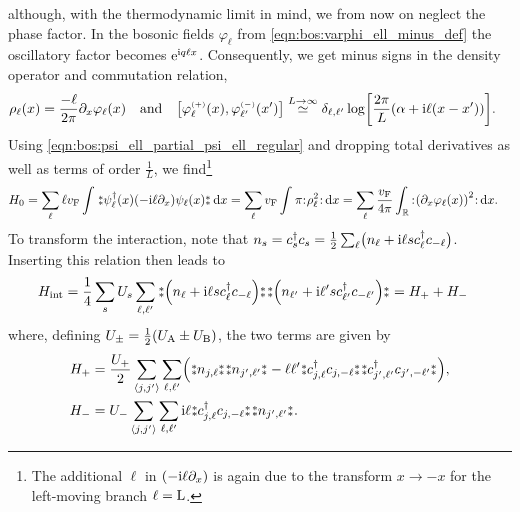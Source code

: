 although, with the thermodynamic limit in mind, we from now on neglect the phase factor.
In the bosonic fields $\varphi_\ell$ from \autoref{eqn:bos:varphi_ell_minus_def} the oscillatory factor becomes $\powe{\i q\ell x}$.
Consequently, we get minus signs in the density operator and commutation relation,
\begin{align}
\rho_\ell(x) &= \frac{-\ell}{2\pi} \partial_x\varphi_\ell(x) \quad\text{and}\quad \klb*{\varphi_\ell\eplus(x), \varphi_{\ell'}\eminus(x')} \asymeq{L\rightarrow\infty} \delta_{\ell,\ell'} \log\klb*{\frac{2\pi}{L} \kla*{\alpha + \i\ell (x-x')}}. \label{eqn:ell:bos:rho_ell_and_varphi_comm}
\end{align}
Using \autoref{eqn:bos:psi_ell_partial_psi_ell_regular} and dropping total derivatives as well as terms of order $\frac{1}{L}$, we find\footnote{The additional $\ell$ in $(-\i\ell\partial_x)$ is again due to the transform $x\rightarrow -x$ for the left-moving branch $\ell=\L$.}
\begin{align*}
H_0 &= \sum_\ell \ell\vf \intx{ }{ }{\varnormord{\psi_\ell^\dagger(x) (-\i\ell\partial_x) \psi_\ell(x)}}{x} = \sum_\ell \vf \intx{ }{ }{\pi\normord{\rho_\ell^2}}{x} = \sum_\ell \frac{\vf}{4\pi} \intr{ \normord{ \kla*{ \partial_x \varphi_\ell(x)}^2 }}{x}.
\end{align*}
To transform the interaction, note that $n_s = c_s^\dagger c_s = \frac{1}{2} \sum_\ell \kla[\big]{n_\ell +\i\ell s c_\ell^\dagger c_{-\ell}}$.
Inserting this relation then leads to
\begin{align*}
H_\text{int} &= \frac{1}{4}\sum_s U_s \sum_{\ell,\ell'} \varnormord{\kla*{n_\ell +\i\ell s c_\ell^\dagger c_{-\ell}}} \varnormord{\kla*{n_{\ell'} +\i\ell' s c_{\ell'}^\dagger c_{-\ell'}}} = H_+ + H_-
\end{align*}
where, defining $U_\pm = \frac{1}{2} \kla*{U_\A \pm U_\B}$, the two terms are given by
\begin{align*}
H_+ &= \frac{U_+}{2} \sum_{\bra*{j,j'}} \sum_{\ell,\ell'} \kla*{\varnormord{n_{j,\ell}} \varnormord{n_{j',\ell'}} -\ell\ell' \varnormord{c_{j,\ell}^\dagger c_{j,-\ell}} \varnormord{c_{j',\ell'}^\dagger c_{j',-\ell'}}},\\
H_- &= U_- \sum_{\bra*{j,j'}} \sum_{\ell,\ell'} \i\ell \varnormord{c_{j,\ell}^\dagger c_{j,-\ell}} \varnormord{n_{j',\ell'}}.
\end{align*}%
